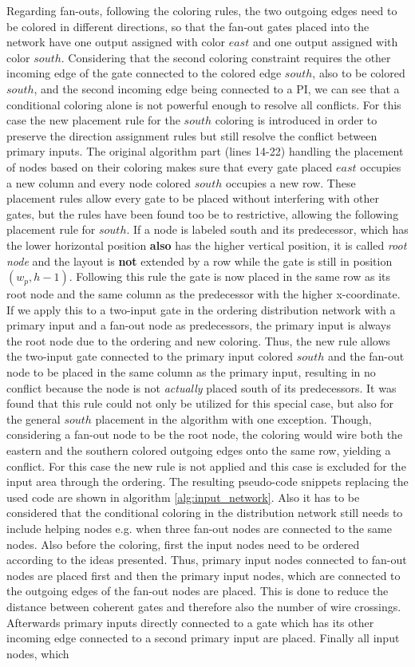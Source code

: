 Regarding fan-outs, following the coloring rules, the two outgoing edges need to be colored in different directions, so that the fan-out gates placed into the network have one output assigned with color $east$ and one output assigned with color $south$. Considering that the second coloring constraint requires the other incoming edge of the gate connected to the colored edge $south$, also to be colored $south$, and the second incoming edge being connected to a PI, we can see that a conditional coloring alone is not powerful enough to resolve all conflicts. For this case the new placement rule for the $south$ coloring is introduced in order to preserve the direction assignment rules but still resolve the conflict between primary inputs. The original algorithm part (lines 14-22) handling the placement of nodes based on their coloring makes sure that every gate placed $east$ occupies a new column and every node colored $south$ occupies a new row. These placement rules allow every gate to be placed without interfering with other gates, but the rules have been found too be to restrictive, allowing the following placement rule for $south$. If a node is labeled south and its predecessor, which has the lower horizontal position \textbf{also} has the higher vertical position, it is called \textit{root node} and the layout is \textbf{not} extended by a row while the gate is still in position $(w_p, h-1)$. Following this rule the gate is now placed in the same row as its root node and the same column as the predecessor with the higher x-coordinate. If we apply this to a two-input gate in the ordering distribution network with a primary input and a fan-out node as predecessors, the primary input is always the root node due to the ordering and new coloring. Thus, the new rule allows the two-input gate connected to the primary input colored $south$ and the fan-out node to be placed in the same column as the primary input, resulting in no conflict because the node is not \textit{actually} placed south of its predecessors. It was found that this rule could not only be utilized for this special case, but also for the general $south$ placement in the algorithm with one exception. Though, considering a fan-out node to be the root node, the coloring would wire both the eastern and the southern colored outgoing edges onto the same row, yielding a conflict. For this case the new rule is not applied and this case is excluded for the input area through the ordering. The resulting pseudo-code snippets replacing the used code are shown in algorithm \ref{alg:input_network}. Also it has to be considered that the conditional coloring in the distribution network still needs to include helping nodes e.g. when three fan-out nodes are connected to the same nodes. Also before the coloring, first the input nodes need to be ordered according to the ideas presented. Thus, primary input nodes connected to fan-out nodes are placed first and then the primary input nodes, which are connected to the outgoing edges of the fan-out nodes are placed. This is done to reduce the distance between coherent gates and therefore also the number of wire crossings. Afterwards primary inputs directly connected to a gate which has its other incoming edge connected to a second primary input are placed. Finally all input nodes, which 